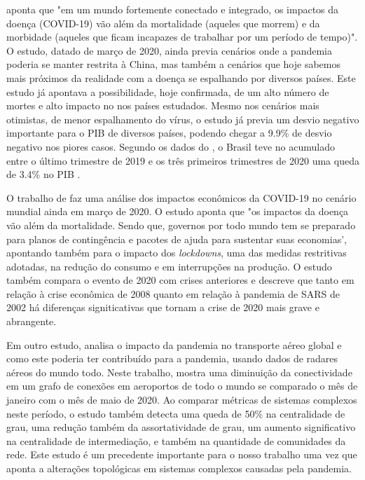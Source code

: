  aponta que "em um mundo fortemente conectado e integrado, os impactos da doença (COVID-19) vão além da mortalidade (aqueles que morrem) e da morbidade (aqueles que ficam incapazes de trabalhar por um período de tempo)". O estudo, datado de março de 2020, ainda previa cenários onde a pandemia poderia se manter restrita à China, mas também a cenários que hoje sabemos mais próximos da realidade com a doença se espalhando por diversos países. Este estudo já apontava a possibilidade, hoje confirmada, de um alto número de mortes e alto impacto no  nos países estudados. Mesmo nos cenários mais otimistas, de menor espalhamento do vírus, o estudo já previa um desvio negativo importante para o PIB de diversos países, podendo chegar a 9.9\% de desvio negativo nos piores casos. Segundo os dados do , o Brasil teve no acumulado entre o último trimestre de 2019 e os três primeiros trimestres de 2020 uma queda de 3.4\% no PIB .

O trabalho de  faz uma análise dos impactos econômicos da COVID-19 no cenário mundial ainda em março de 2020. O estudo aponta que "os impactos da doença vão além da mortalidade. Sendo que, governos por todo mundo tem se preparado para planos de contingência e pacotes de ajuda para sustentar suas economias', apontando também para o impacto dos \textit{lockdowns}, uma das medidas restritivas adotadas, na redução do consumo e em interrupções na produção. O estudo também compara o evento de 2020 com crises anteriores e descreve que tanto em relação à crise econômica de 2008 quanto em relação à pandemia de SARS de 2002 há diferenças signiticativas que tornam a crise de 2020 mais grave e abrangente.

Em outro estudo,  analisa o impacto da pandemia no transporte aéreo global e como este poderia ter contribuído para a pandemia, usando dados de radares aéreos do mundo todo. Neste trabalho,  mostra uma diminuição da conectividade em um grafo de conexões em aeroportos de todo o mundo se comparado o mês de janeiro com o mês de maio de 2020. Ao comparar métricas de sistemas complexos neste período, o estudo também detecta uma queda de 50\% na centralidade de grau, uma redução também da assortatividade de grau, um aumento significativo na centralidade de intermediação, e também na quantidade de comunidades da rede. Este estudo é um precedente importante para o nosso trabalho uma vez que aponta a alterações topológicas em sistemas complexos causadas pela pandemia.

